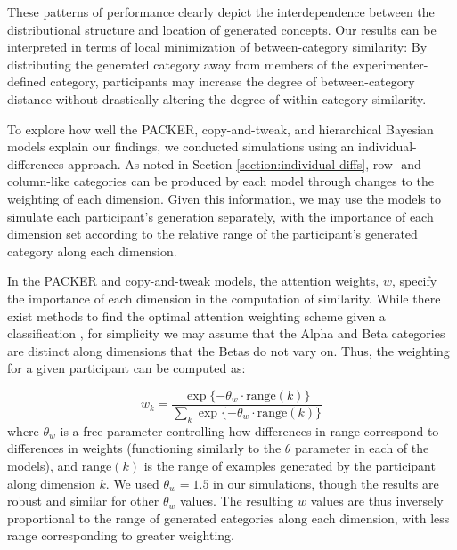 \documentclass[12pt]{article}
\begin{document}
\begin{flushleft}
These patterns of performance clearly depict the interdependence between the distributional structure and location of generated concepts. Our results can be interpreted in terms of local minimization of between-category similarity: By distributing the generated category away from members of the experimenter-defined category, participants may increase the degree of between-category distance without drastically altering the degree of within-category similarity.

To explore how well the PACKER, copy-and-tweak, and hierarchical Bayesian models explain our findings, we conducted simulations using an individual-differences approach. As noted in Section \ref{section:individual-diffs}, row- and column-like categories can be produced by each model through changes to the weighting of each dimension. Given this information, we may use the models to simulate each participant's generation separately, with the importance of each dimension set according to the relative range of the participant's generated category along each dimension. 

In the PACKER and copy-and-tweak models, the attention weights, $w$, specify the importance of each dimension in the computation of similarity. While there exist methods to find the optimal attention weighting scheme given a classification \citep[see][]{vanpaemel2012using}, for simplicity we may assume that the Alpha and Beta categories are distinct along dimensions that the Betas do not vary on. Thus, the weighting for a given participant can be computed as:

\begin{equation}
w_k = \dfrac
{\exp{ \{ -\theta_w \cdot\text{range}(k)}  \} } 
{ \sum_k {\exp{ \{ -\theta_w \cdot\text{range}(k)}  \} } }
\label{eq:range-weight}
\end{equation}
% 
where $\theta_w$ is a free parameter controlling how differences in range correspond to differences in weights (functioning similarly to the $\theta$ parameter in each of the models), and $\text{range}(k)$ is the range of examples generated by the participant along dimension $k$. We used $\theta_w = 1.5$ in our simulations, though the results are robust and similar for other $\theta_w$ values. The resulting $w$ values are thus inversely proportional to the range of generated categories along each dimension, with less range corresponding to greater weighting.


\end{flushleft}
\end{document}
